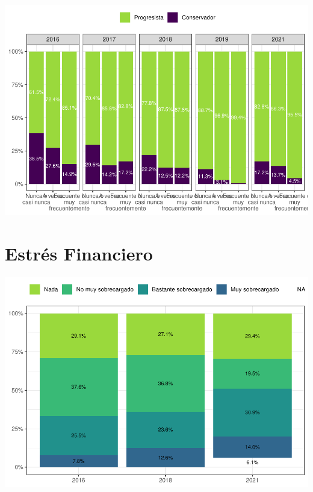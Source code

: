 \documentclass[
  12pt,
]{book}
\begin{document}
\begin{center}\includegraphics{reporte-elsoc_files/figure-latex/unnamed-chunk-12-1} \end{center}

\hypertarget{estruxe9s-financiero}{%
\section{Estrés Financiero}\label{estruxe9s-financiero}}

\begin{center}\includegraphics{reporte-elsoc_files/figure-latex/satisfaccion-wave-1} \end{center}
\end{document}
